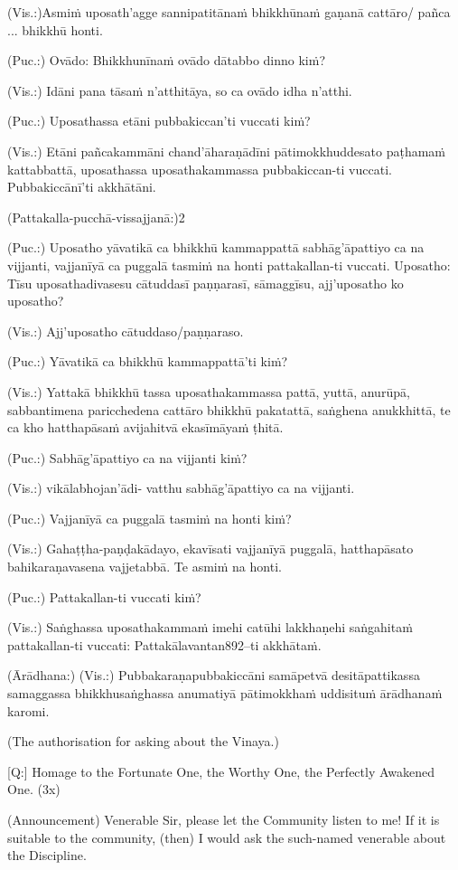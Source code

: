 (Vis.:)Asmiṁ uposath'agge sannipatitānaṁ bhikkhūnaṁ gaṇanā cattāro/
pañca ... bhikkhū honti.

(Puc.:) Ovādo: Bhikkhunīnaṁ ovādo dātabbo dinno kiṁ?

(Vis.:) Idāni pana tāsaṁ n'atthitāya, so ca ovādo idha n'atthi.

(Puc.:) Uposathassa etāni pubbakiccan'ti vuccati kiṁ?

(Vis.:) Etāni pañcakammāni chand'āharaṇādīni pātimokkhuddesato
paṭhamaṁ kattabbattā, uposathassa uposathakammassa pubbakiccan-ti
vuccati. Pubbakiccānī'ti akkhātāni.

(Pattakalla-pucchā-vissajjanā:)2

(Puc.:) Uposatho yāvatikā ca bhikkhū kammappattā sabhāg'āpattiyo ca na
vijjanti, vajjanīyā ca puggalā tasmiṁ na honti pattakallan-ti vuccati.
Uposatho: Tīsu uposathadivasesu cātuddasī paṇṇarasī, sāmaggīsu,
ajj'uposatho ko uposatho?

(Vis.:) Ajj'uposatho cātuddaso/paṇṇaraso.

(Puc.:) Yāvatikā ca bhikkhū kammappattā'ti kiṁ?

(Vis.:) Yattakā bhikkhū tassa uposathakammassa pattā, yuttā, anurūpā,
sabbantimena paricchedena cattāro bhikkhū pakatattā, saṅghena
anukkhittā, te ca kho hatthapāsaṁ avijahitvā ekasīmāyaṁ ṭhitā.

(Puc.:) Sabhāg'āpattiyo ca na vijjanti kiṁ?

(Vis.:) vikālabhojan'ādi- vatthu sabhāg'āpattiyo ca na vijjanti.

(Puc.:) Vajjanīyā ca puggalā tasmiṁ na honti kiṁ?

(Vis.:) Gahaṭṭha-paṇḍakādayo, ekavīsati vajjanīyā puggalā, hatthapāsato
bahikaraṇavasena vajjetabbā. Te asmiṁ na honti.

(Puc.:) Pattakallan-ti vuccati kiṁ?

(Vis.:) Saṅghassa uposathakammaṁ imehi catūhi lakkhaṇehi saṅgahitaṁ
pattakallan-ti vuccati: Pattakālavantan892–ti akkhātaṁ.

(Ārādhana:)
(Vis.:) Pubbakaraṇapubbakiccāni samāpetvā desitāpattikassa samaggassa
bhikkhusaṅghassa anumatiyā pātimokkhaṁ uddisituṁ ārādhanaṁ
karomi.

\clearpage

(The authorisation for asking about the Vinaya.)

[Q:] Homage to the Fortunate One, the Worthy One, the Perfectly
Awakened One. (3x)

(Announcement)
Venerable Sir, please let the Community listen to me! If it is suitable
to the community, (then) I would ask the such-named venerable
about the Discipline.

